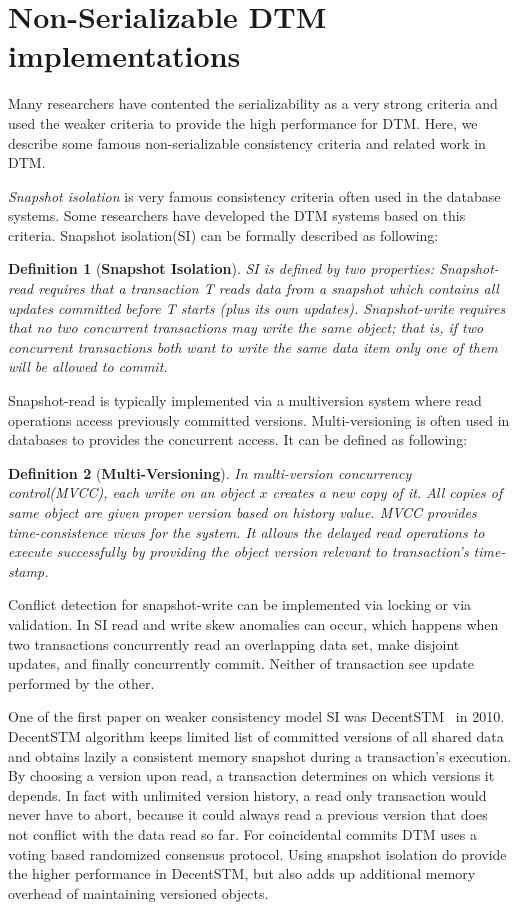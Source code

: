 \documentclass[12pt,english]{report}
\newtheorem{definition}{Definition}[section]
\begin{document}
\section{Non-Serializable DTM implementations}

Many researchers have contented the serializability as a very strong criteria and used the weaker criteria to provide the high performance for DTM. Here, we describe some famous non-serializable consistency criteria and  related work in DTM. 

\textit{Snapshot isolation} is very famous consistency criteria often used in the database systems. Some researchers have developed the DTM systems based on this criteria. Snapshot isolation(SI) can be formally described as following:

\begin{definition}[\textbf{Snapshot Isolation}]
SI is defined by two properties: \textit{Snapshot-read} requires that a transaction T reads data from a snapshot which contains all updates committed before T starts (plus its own updates). \textit{Snapshot-write} requires that no two concurrent transactions may write the same object; that is, if two concurrent transactions both want to write the same data item only one of them will be allowed to commit.
\end{definition}

Snapshot-read is typically implemented via a multiversion system where read operations access previously committed versions. Multi-versioning is often used in databases to provides the concurrent access. It can be defined as following:
\begin{definition}[\textbf{Multi-Versioning}]
In multi-version concurrency control(MVCC), each write on an object $x$ creates a new copy of it. All copies of same object are given proper version based on history value. MVCC provides time-consistence views for the system. It allows the delayed read operations to execute successfully by providing the object version relevant to transaction's time-stamp. 
\end{definition}

Conflict detection for snapshot-write can be implemented via locking or via validation. In SI read and write skew anomalies can occur, which happens when two transactions concurrently read an overlapping data set, make disjoint updates, and finally concurrently commit. Neither of transaction see update performed by the other.

One of the first paper on weaker consistency model SI was DecentSTM~\cite{DecentSTM:5470446} in 2010.  DecentSTM algorithm keeps limited list of committed versions of all shared data and obtains lazily a consistent memory snapshot during a transaction’s execution. By choosing a version upon read, a transaction determines on which versions it depends. In fact with unlimited version history, a read only transaction would never have to abort, because it could always read a previous version that does not conflict with the data read so far. For coincidental commits DTM uses a voting based randomized consensus protocol. Using snapshot isolation do provide the higher performance in DecentSTM, but also adds up additional memory overhead of maintaining versioned objects.  
\end{document}
